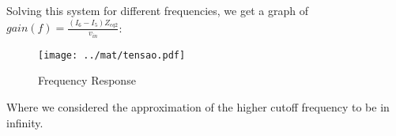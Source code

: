 Solving this system for different frequencies, we get a graph of $gain(f)= \frac{(I_6 - I_5) Z_{eq2}}{v_{in}}$:

\begin{figure}[H] \centering
\texttt{[image: ../mat/tensao.pdf]}
\caption{Frequency Response}
\label{fig:freq}
\end{figure}

Where we considered the approximation of the higher cutoff frequency to be in infinity.



